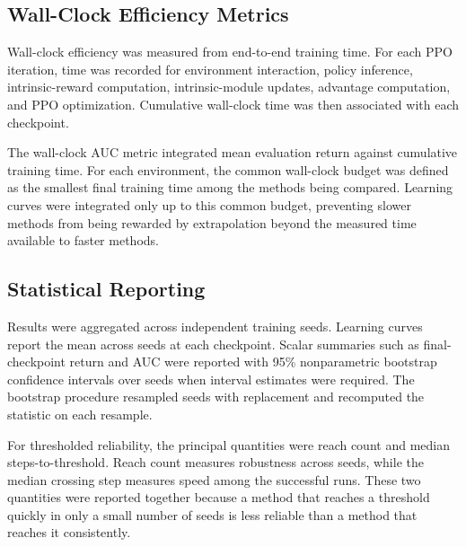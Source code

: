 \subsection{Wall-Clock Efficiency Metrics}
\label{subsec:methodology_wall_clock_efficiency_metrics}

Wall-clock efficiency was measured from end-to-end training time.
For each PPO iteration, time was recorded for environment interaction, policy inference, intrinsic-reward computation, intrinsic-module updates, advantage computation, and PPO optimization.
Cumulative wall-clock time was then associated with each checkpoint.

The wall-clock AUC metric integrated mean evaluation return against cumulative training time.
For each environment, the common wall-clock budget was defined as the smallest final training time among the methods being compared.
Learning curves were integrated only up to this common budget, preventing slower methods from being rewarded by extrapolation beyond the measured time available to faster methods.

\subsection{Statistical Reporting}
\label{subsec:methodology_statistical_reporting}

Results were aggregated across independent training seeds.
Learning curves report the mean across seeds at each checkpoint.
Scalar summaries such as final-checkpoint return and AUC were reported with 95\% nonparametric bootstrap confidence intervals over seeds when interval estimates were required.
The bootstrap procedure resampled seeds with replacement and recomputed the statistic on each resample.

For thresholded reliability, the principal quantities were reach count and median steps-to-threshold.
Reach count measures robustness across seeds, while the median crossing step measures speed among the successful runs.
These two quantities were reported together because a method that reaches a threshold quickly in only a small number of seeds is less reliable than a method that reaches it consistently.
